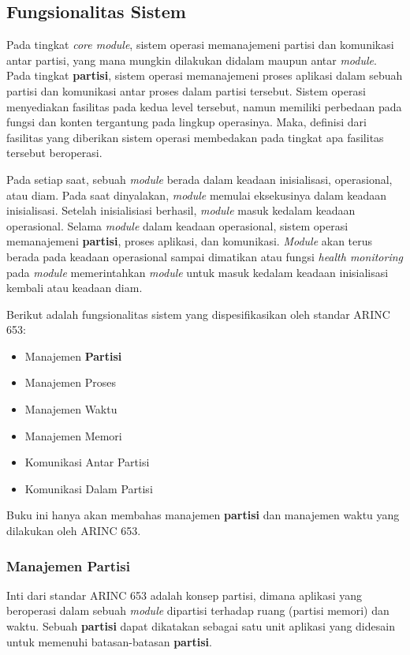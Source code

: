 \subsection{Fungsionalitas Sistem}

Pada tingkat \textit{core module}, sistem operasi memanajemeni partisi dan komunikasi antar partisi, yang mana mungkin dilakukan didalam maupun antar \textit{module}.
Pada tingkat \textbf{partisi}, sistem operasi memanajemeni proses aplikasi dalam sebuah partisi dan komunikasi antar proses dalam partisi tersebut.
Sistem operasi menyediakan fasilitas pada kedua level tersebut, namun memiliki perbedaan pada fungsi dan konten tergantung pada lingkup operasinya.
Maka, definisi dari fasilitas yang diberikan sistem operasi membedakan pada tingkat apa fasilitas tersebut beroperasi.

Pada setiap saat, sebuah \textit{module} berada dalam keadaan inisialisasi, operasional, atau diam.
Pada saat dinyalakan, \textit{module} memulai eksekusinya dalam keadaan inisialisasi.
Setelah inisialisiasi berhasil, \textit{module} masuk kedalam keadaan operasional.
Selama \textit{module} dalam keadaan operasional, sistem operasi memanajemeni \textbf{partisi}, proses aplikasi, dan komunikasi.
\textit{Module} akan terus berada pada keadaan operasional sampai dimatikan atau fungsi \textit{health monitoring} pada \textit{module} memerintahkan \textit{module} untuk masuk kedalam keadaan inisialisasi kembali atau keadaan diam.

Berikut adalah fungsionalitas sistem yang dispesifikasikan oleh standar ARINC 653:
\begin{itemize}
    \item Manajemen \textbf{Partisi}
    \item Manajemen Proses
    \item Manajemen Waktu
    \item Manajemen Memori
    \item Komunikasi Antar Partisi
    \item Komunikasi Dalam Partisi
\end{itemize}
Buku ini hanya akan membahas manajemen \textbf{partisi} dan manajemen waktu yang dilakukan oleh ARINC 653.

\subsubsection[Manajemen Partisi]{Manajemen \textbf{Partisi}}

Inti dari standar ARINC 653 adalah konsep partisi, dimana aplikasi yang beroperasi dalam sebuah \textit{module} dipartisi terhadap ruang (partisi memori) dan waktu.
Sebuah \textbf{partisi} dapat dikatakan sebagai satu unit aplikasi yang didesain untuk memenuhi batasan-batasan \textbf{partisi}.


